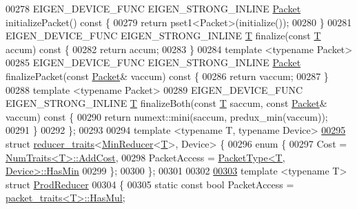 \begin{DoxyCode}
00278   EIGEN\_DEVICE\_FUNC EIGEN\_STRONG\_INLINE \hyperlink{union_eigen_1_1internal_1_1_packet}{Packet} initializePacket()\textcolor{keyword}{ const }\{
00279     \textcolor{keywordflow}{return} pset1<Packet>(initialize());
00280   \}
00281   EIGEN\_DEVICE\_FUNC EIGEN\_STRONG\_INLINE \hyperlink{group___sparse_core___module}{T} finalize(\textcolor{keyword}{const} \hyperlink{group___sparse_core___module}{T} accum)\textcolor{keyword}{ const }\{
00282     \textcolor{keywordflow}{return} accum;
00283   \}
00284   \textcolor{keyword}{template} <\textcolor{keyword}{typename} Packet>
00285   EIGEN\_DEVICE\_FUNC EIGEN\_STRONG\_INLINE \hyperlink{union_eigen_1_1internal_1_1_packet}{Packet} finalizePacket(\textcolor{keyword}{const} \hyperlink{union_eigen_1_1internal_1_1_packet}{Packet}& vaccum)\textcolor{keyword}{ const }\{
00286     \textcolor{keywordflow}{return} vaccum;
00287   \}
00288   \textcolor{keyword}{template} <\textcolor{keyword}{typename} Packet>
00289   EIGEN\_DEVICE\_FUNC EIGEN\_STRONG\_INLINE \hyperlink{group___sparse_core___module}{T} finalizeBoth(\textcolor{keyword}{const} \hyperlink{group___sparse_core___module}{T} saccum, \textcolor{keyword}{const} 
      \hyperlink{union_eigen_1_1internal_1_1_packet}{Packet}& vaccum)\textcolor{keyword}{ const }\{
00290     \textcolor{keywordflow}{return} numext::mini(saccum, predux\_min(vaccum));
00291   \}
00292 \};
00293 
00294 \textcolor{keyword}{template} <\textcolor{keyword}{typename} T, \textcolor{keyword}{typename} Device>
\hyperlink{struct_eigen_1_1internal_1_1reducer__traits_3_01_min_reducer_3_01_t_01_4_00_01_device_01_4}{00295} \textcolor{keyword}{struct }\hyperlink{struct_eigen_1_1internal_1_1reducer__traits}{reducer\_traits}<\hyperlink{struct_eigen_1_1internal_1_1_min_reducer}{MinReducer}<\hyperlink{group___sparse_core___module}{T}>, Device> \{
00296   \textcolor{keyword}{enum} \{
00297     Cost = \hyperlink{group___core___module_struct_eigen_1_1_num_traits}{NumTraits<T>::AddCost},
00298     PacketAccess = \hyperlink{struct_eigen_1_1_packet_type}{PacketType<T, Device>::HasMin}
00299   \};
00300 \};
00301 
00302 
\hyperlink{struct_eigen_1_1internal_1_1_prod_reducer}{00303} \textcolor{keyword}{template} <\textcolor{keyword}{typename} T> \textcolor{keyword}{struct }\hyperlink{struct_eigen_1_1internal_1_1_prod_reducer}{ProdReducer}
00304 \{
00305   \textcolor{keyword}{static} \textcolor{keyword}{const} \textcolor{keywordtype}{bool} PacketAccess = \hyperlink{struct_eigen_1_1internal_1_1packet__traits}{packet\_traits<T>::HasMul};

\end{DoxyCode}
